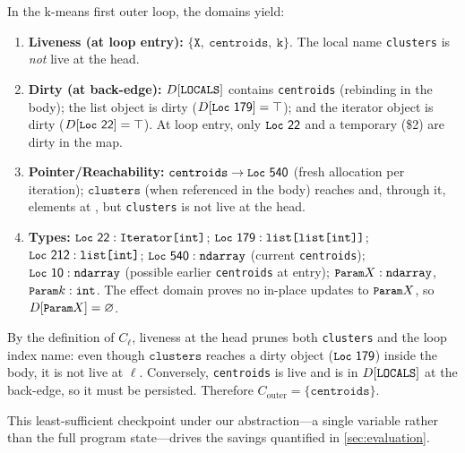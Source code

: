 \begin{example}
In the k-means first outer loop, the domains yield:
\end{example}

\begin{enumerate}
\item \textbf{Liveness (at loop entry):}
  $\{\texttt{X},\ \texttt{centroids},\ \texttt{k}\}$.
  The local name \texttt{clusters} is \emph{not} live at the head.
\item \textbf{Dirty (at back-edge):}
  \(D[\texttt{LOCALS}]\) contains \texttt{centroids} (rebinding in the body); the list object  is dirty
  (\(D[\textsf{\texttt{\small Loc}~{179}}] = \top\)); and the iterator object  is dirty (\(D[\textsf{\texttt{\small Loc}~{22}}] = \top\)).
  At loop entry, only \(\textsf{\texttt{\small Loc}~{22}}\) and a temporary (\$2) are dirty in the map.
\item \textbf{Pointer/Reachability:}
  \(\texttt{centroids} \to \textsf{\texttt{\small Loc}~{540}}\) (fresh allocation per iteration);
  \(\texttt{clusters}\) (when referenced in the body) reaches  and, through it, elements at ,
  but \texttt{clusters} is not live at the head.
\item \textbf{Types:}
  \(\textsf{\texttt{\small Loc}~{22}} : \texttt{Iterator[int]}\);
  \(\textsf{\texttt{\small Loc}~{179}} : \texttt{list[list[int]]}\);
  \(\textsf{\texttt{\small Loc}~{212}} : \texttt{list[int]}\);
  \(\textsf{\texttt{\small Loc}~{540}} : \texttt{ndarray}\) (current \texttt{centroids});
  \(\textsf{\texttt{\small Loc}~{10}} : \texttt{ndarray}\) (possible earlier \texttt{centroids} at entry);
  \(\texttt{\small Param} X : \texttt{ndarray}\), \(\texttt{\small Param} k : \texttt{int}\).
  The effect domain proves no in-place updates to \(\texttt{\small Param} X\), so \(D[\texttt{\small Param} X]=\varnothing\).
\end{enumerate}

By the definition of \(C_\ell\), liveness at the head prunes both \texttt{clusters} and the loop index name:
even though \(\texttt{clusters}\) reaches a dirty object (\(\textsf{\texttt{\small Loc}~{179}}\)) inside the body, it is not live at \(\ell\).
Conversely, \texttt{centroids} is live and is in \(D[\texttt{LOCALS}]\) at the back-edge, so it must be persisted.
Therefore \(C_{\text{outer}}=\{\texttt{centroids}\}\).

This least-sufficient checkpoint under our abstraction—a single variable rather than the full program state—drives the savings quantified in \cref{sec:evaluation}.
